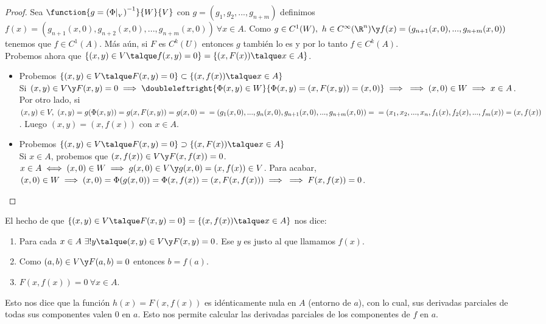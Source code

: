 \begin{proof}
Sea $\function{g=\left(\Phi|_{_V}\right)^{-1}}{W}{V}$ con $g=(g_1,g_2,...,g_{n+m})$ definimos\\
$f(x)=(g_{n+1}(x,0),g_{n+2}(x,0),...,g_{n+m}(x,0))\ \forall x\in A$. Como $g\in C^1(W),\ h\in C^\infty(\R^n)\y\\
f(x)=(g_{n+1}(x,0),...,g_{n+m}(x,0))$ tenemos que $f\in C^1(A)$. Más aún, si $F$ es $C^k(U)$ entonces $g$ también lo es y por lo tanto $f\in C^k(A)$.\\
Probemos ahora que $\{(x,y)\in V\talque f(x,y)=0\}=\{(x,F(x))\talque x\in A\}$.
\begin{itemize}
\item Probemos $\{(x,y)\in V\talque F(x,y)=0\}\subset\{(x,f(x))\talque x\in A\}$\\
Si $(x,y)\in V\y F(x,y)=0\implies\doubleleftright{\Phi(x,y)\in W}{\Phi(x,y)=(x,F(x,y))=(x,0)}\implies\\ \implies (x,0)\in W\implies x\in A$.\\
Por otro lado, si $(x,y)\in V,\ (x,y)=g(\Phi(x,y))=g(x,F(x,y))=g(x,0)=\\=(g_1(x,0),...,g_n(x,0),g_{n+1}(x,0),...,g_{n+m}(x,0))=\\=(x_1,x_2,...,x_n,f_1(x),f_2(x),...,f_m(x))=(x,f(x))$. Luego $(x,y)=(x,f(x))$ con $x\in A$.
\item Probemos $\{(x,y)\in V\talque F(x,y)=0\}\supset\{(x,F(x))\talque x\in A\}$\\
Si $x\in A$, probemos que $(x,f(x))\in V\y F(x,f(x))=0$.\\
$x\in A\iff(x,0)\in W\implies g(x,0)\in V\y g(x,0)=(x,f(x))\in V$. Para acabar, $(x,0)\in W\implies(x,0)=\Phi(g(x,0))=\Phi(x,f(x))=(x,F(x,f(x)))\implies\\\implies F(x,f(x))=0$.
\end{itemize}
\end{proof}

\begin{observacion} El hecho de que $\{(x,y)\in V\talque F(x,y)=0\}=\{(x,f(x))\talque x\in A\}$ nos dice:
\begin{enumerate}[1)]
\item Para cada $x\in A\ \exists!y\talque (x,y)\in V\y F(x,y)=0$. Ese $y$ es justo al que llamamos $f(x)$.
\item Como $(a,b)\in V\y F(a,b)=0$ entonces $b=f(a)$.
\item $F(x,f(x))=0\ \forall x\in A$.
\end{enumerate}
Esto nos dice que la función $h(x)=F(x,f(x))$ es idénticamente nula en $A$ (entorno de $a$), con lo cual, sus derivadas parciales de todas sus componentes valen $0$ en $a$. Esto nos permite calcular las derivadas parciales de los componentes de $f$ en $a$.
\end{observacion}

